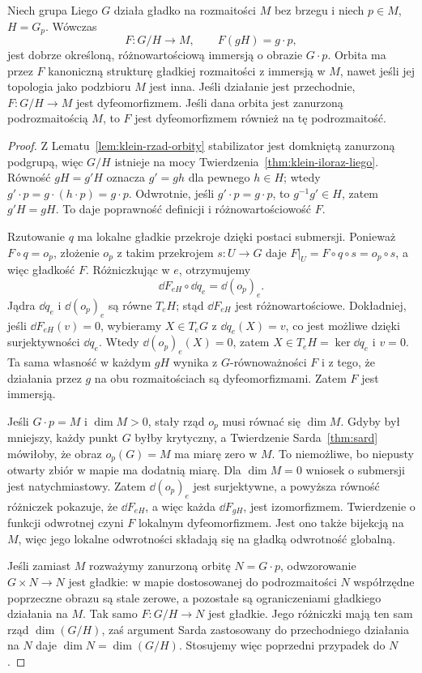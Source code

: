 \begin{twierdzenie}
\label{thm:klein-orbita-iloraz}
Niech grupa Liego $G$ działa gładko na rozmaitości $M$ bez brzegu
i niech $p\in M$, $H=G_p$. Wówczas
\[
 F:G/H\longrightarrow M,\qquad F(gH)=g\cdot p,
\]
jest dobrze określoną, różnowartościową immersją o obrazie
$G\cdot p$. Orbita ma przez $F$ kanoniczną strukturę gładkiej
rozmaitości z immersją w $M$, nawet jeśli jej topologia jako
podzbioru $M$ jest inna. Jeśli działanie jest przechodnie,
$F:G/H\to M$ jest
dyfeomorfizmem. Jeśli dana orbita jest zanurzoną podrozmaitością
$M$, to $F$ jest dyfeomorfizmem również na tę podrozmaitość.
\end{twierdzenie}
\begin{proof}
Z Lematu~\ref{lem:klein-rzad-orbity} stabilizator jest domkniętą
zanurzoną podgrupą, więc $G/H$ istnieje na mocy
Twierdzenia~\ref{thm:klein-iloraz-liego}. Równość
$gH=g'H$ oznacza $g'=gh$ dla pewnego $h\in H$; wtedy
$g'\cdot p=g\cdot(h\cdot p)=g\cdot p$. Odwrotnie, jeśli
$g'\cdot p=g\cdot p$, to $g^{-1}g'\in H$, zatem $g'H=gH$.
To daje poprawność definicji i różnowartościowość $F$.

Rzutowanie $q$ ma lokalne gładkie przekroje dzięki postaci
submersji. Ponieważ $F\circ q=o_p$, złożenie $o_p$ z takim
przekrojem $s:U\to G$ daje
$F|_U=F\circ q\circ s=o_p\circ s$, a więc gładkość $F$.
Różniczkując w $e$, otrzymujemy
\[
 \dd F_{eH}\circ\dd q_e=\dd(o_p)_e.
\]
Jądra $\dd q_e$ i $\dd(o_p)_e$ są równe $T_eH$;
stąd $\dd F_{eH}$ jest różnowartościowe.
Dokładniej, jeśli $\dd F_{eH}(v)=0$, wybieramy $X\in T_eG$
z $\dd q_e(X)=v$, co jest możliwe dzięki surjektywności
$\dd q_e$. Wtedy $\dd(o_p)_e(X)=0$, zatem
$X\in T_eH=\ker\dd q_e$ i $v=0$.
Ta sama własność
w każdym $gH$ wynika z $G$-równoważności $F$ i z tego, że
działania przez $g$ na obu rozmaitościach są dyfeomorfizmami.
Zatem $F$ jest immersją.

Jeśli $G\cdot p=M$ i $\dim M>0$, stały rząd $o_p$ musi
równać się $\dim M$. Gdyby był mniejszy, każdy punkt $G$
byłby krytyczny, a Twierdzenie Sarda~\ref{thm:sard} mówiłoby,
że obraz $o_p(G)=M$ ma miarę zero w $M$. To niemożliwe,
bo niepusty otwarty zbiór w mapie ma dodatnią miarę.
Dla $\dim M=0$ wniosek o submersji jest natychmiastowy.
Zatem $\dd(o_p)_e$ jest surjektywne, a powyższa równość
różniczek pokazuje, że $\dd F_{eH}$, a więc każda
$\dd F_{gH}$, jest izomorfizmem. Twierdzenie o funkcji
odwrotnej czyni $F$ lokalnym dyfeomorfizmem. Jest ono także
bijekcją na $M$, więc jego lokalne odwrotności składają się
na gładką odwrotność globalną.

Jeśli zamiast $M$ rozważymy zanurzoną orbitę $N=G\cdot p$,
odwzorowanie $G\times N\to N$ jest gładkie:
w mapie dostosowanej do podrozmaitości $N$ współrzędne
poprzeczne obrazu są stale zerowe, a pozostałe są
ograniczeniami gładkiego działania na $M$.
Tak samo $F:G/H\to N$ jest gładkie. Jego różniczki mają ten sam rząd
$\dim(G/H)$, zaś argument Sarda zastosowany do przechodniego
działania na $N$ daje $\dim N=\dim(G/H)$. Stosujemy więc
poprzedni przypadek do $N$.
\end{proof}

